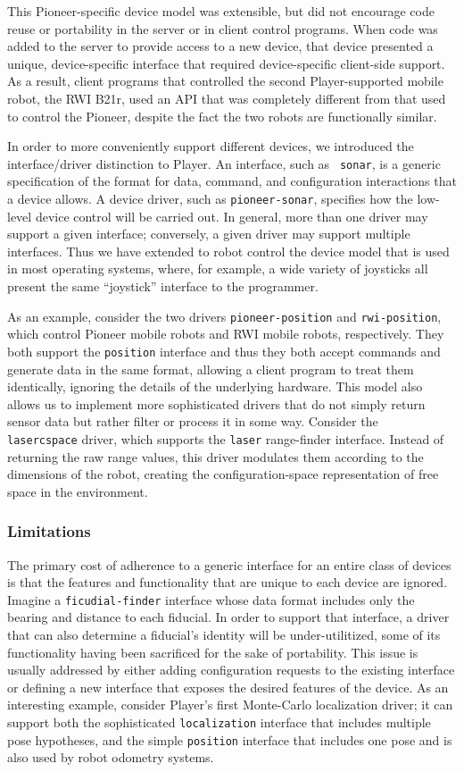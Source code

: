 \documentclass[letterpaper, 10 pt, conference]{iros03}
\begin{document}
This Pioneer-specific device model was extensible, but did not encourage
code reuse or portability in the server or in client control programs.
When code was added to the server to provide access to a new device,
that device presented a unique, device-specific interface that required
device-specific client-side support.  As a result, client programs that
controlled the second Player-supported mobile robot, the RWI B21r, used an
API that was completely different from that used to control the Pioneer,
despite the fact the two robots are functionally similar.

In order to more conveniently support different devices, we introduced
the interface/driver distinction to Player. An interface, such as {\tt
sonar}, is a generic specification of the format for data, command,
and configuration interactions that a device allows.  A device driver,
such as {\tt pioneer-sonar}, specifies how the low-level device
control will be carried out.  In general, more than one driver may
support a given interface; conversely, a given driver may support
multiple interfaces.  Thus we have extended to robot control the
device model that is used in most operating systems, where, for
example, a wide variety of joysticks all present the same ``joystick''
interface to the programmer.

As an example, consider the two drivers {\tt pioneer-position} and
{\tt rwi-position}, which control Pioneer mobile robots and RWI mobile
robots, respectively.  They both support the {\tt position} interface
and thus they both accept commands and generate data in the same
format, allowing a client program to treat them identically, ignoring
the details of the underlying hardware.  This model also allows us to
implement more sophisticated drivers that do not simply return sensor
data but rather filter or process it in some way.  Consider the {\tt
lasercspace} driver, which supports the {\tt laser} range-finder
interface.  Instead of returning the raw range values, this driver
modulates them according to the dimensions of the robot, creating the
configuration-space representation of free space in the environment.

\subsubsection{Limitations}
The primary cost of adherence to a generic interface for an entire class
of devices is that the features and functionality that are unique to
each device are ignored.  Imagine a {\tt ficudial-finder} interface
whose data format includes only the bearing and distance to each
fiducial.  In order to support that interface, a driver that can also
determine a fiducial's identity will be under-utilitized, some
of its functionality having been sacrificed for the sake of portability.
This issue is usually addressed by either adding configuration requests
to the existing interface or defining a new interface that exposes the
desired features of the device.  As an interesting example, consider
Player's first Monte-Carlo localization driver; it can support both
the sophisticated {\tt localization} interface that includes multiple
pose hypotheses, and the simple {\tt position} interface that includes
one pose and is also used by robot odometry systems.
\end{document}
